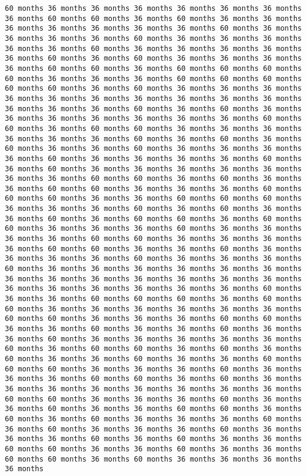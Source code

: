 \documentclass[11pt]{article}
\begin{document}
\begin{Verbatim}[commandchars=\\\{\}, frame=single, framerule=2mm, rulecolor=\color{outerrorbackground}]
60 months 36 months 36 months 36 months 36 months 36 months 36 months 36 months 60 months 60 months 36 months 60 months 36 months 36 months 36 months 36 months 36 months 36 months 36 months 60 months 36 months 36 months 36 months 36 months 60 months 36 months 36 months 36 months 36 months 36 months 60 months 36 months 36 months 36 months 36 months 36 months 60 months 36 months 60 months 36 months 36 months 36 months 36 months 60 months 60 months 36 months 60 months 60 months 60 months 60 months 36 months 36 months 36 months 60 months 60 months 60 months 60 months 60 months 36 months 60 months 36 months 36 months 36 months 36 months 36 months 36 months 36 months 36 months 36 months 36 months 36 months 36 months 36 months 60 months 36 months 60 months 36 months 36 months 36 months 36 months 36 months 36 months 36 months 60 months 60 months 36 months 60 months 60 months 36 months 36 months 36 months 36 months 36 months 36 months 60 months 36 months 60 months 36 months 60 months 36 months 36 months 60 months 36 months 36 months 36 months 36 months 60 months 36 months 36 months 36 months 36 months 60 months 36 months 60 months 36 months 36 months 36 months 36 months 36 months 36 months 36 months 60 months 60 months 36 months 60 months 36 months 36 months 60 months 60 months 36 months 36 months 36 months 60 months 60 months 60 months 36 months 36 months 60 months 60 months 60 months 36 months 36 months 36 months 60 months 36 months 60 months 36 months 36 months 60 months 36 months 60 months 60 months 36 months 60 months 60 months 36 months 36 months 36 months 60 months 36 months 36 months 36 months 36 months 60 months 60 months 36 months 36 months 36 months 36 months 60 months 60 months 36 months 36 months 60 months 36 months 36 months 36 months 36 months 60 months 36 months 36 months 36 months 60 months 36 months 36 months 36 months 36 months 36 months 36 months 36 months 36 months 36 months 36 months 36 months 36 months 36 months 36 months 36 months 36 months 36 months 36 months 36 months 60 months 36 months 36 months 60 months 60 months 60 months 36 months 60 months 60 months 36 months 36 months 36 months 36 months 36 months 36 months 60 months 60 months 36 months 36 months 36 months 60 months 60 months 36 months 36 months 60 months 36 months 36 months 60 months 36 months 36 months 60 months 36 months 36 months 36 months 36 months 36 months 60 months 36 months 60 months 60 months 36 months 60 months 36 months 60 months 36 months 36 months 60 months 36 months 36 months 60 months 60 months 60 months 36 months 36 months 36 months 60 months 36 months 36 months 36 months 60 months 60 months 36 months 60 months 36 months 36 months 36 months 36 months 36 months 36 months 36 months 36 months 60 months 60 months 36 months 36 months 36 months 60 months 36 months 36 months 60 months 36 months 36 months 60 months 60 months 36 months 60 months 36 months 60 months 36 months 36 months 36 months 60 months 36 months 60 months 36 months 36 months 36 months 60 months 36 months 36 months 36 months 60 months 36 months 60 months 36 months 36 months 60 months 60 months 36 months 36 months 60 months 36 months 36 months 60 months 60 months 36 months 60 months 36 months 36 months 36 months 36 months 
\end{Verbatim}
\end{document}
